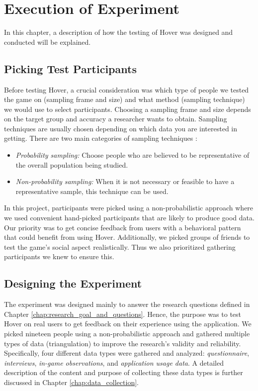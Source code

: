 \section{Execution of Experiment}
\label{chap:execution}
In this chapter, a description of how the testing of Hover was designed and conducted will be explained.

\subsection{Picking Test Participants}
Before testing Hover, a crucial consideration was which type of people we tested the game on (sampling frame and size) and what method (sampling technique) we would use to select participants. Choosing a sampling frame and size depends on the target group and accuracy a researcher wants to obtain. Sampling techniques are usually chosen depending on which data you are interested in getting. There are two main categories of sampling techniques \citep{oates_researching_2006}:

\begin{itemize}
    \item \textit{Probability sampling:} Choose people who are believed to be representative of the overall population being studied.
    \item \textit{Non-probability sampling:} When it is not necessary or feasible to have a representative sample, this technique can be used.
\end{itemize}

In this project, participants were picked using a non-probabilistic approach where we used convenient hand-picked participants that are likely to produce good data. Our priority was to get concise feedback from users with a behavioral pattern that could benefit from using Hover. Additionally, we picked groups of friends to test the game’s social aspect realistically. Thus we also prioritized gathering participants we knew to ensure this.

\subsection{Designing the Experiment}
The experiment was designed mainly to answer the research questions defined in Chapter \ref{chap:research_goal_and_questions}. Hence, the purpose was to test Hover on real users to get feedback on their experience using the application. We picked nineteen people using a non-probabilistic approach and gathered multiple types of data (triangulation) to improve the research’s validity and reliability. Specifically, four different data types were gathered and analyzed: \textit{questionnaire}, \textit{interviews}, \textit{in-game observations}, and \textit{application usage data}. A detailed description of the content and purpose of collecting these data types is further discussed in Chapter \ref{chap:data_collection}.

